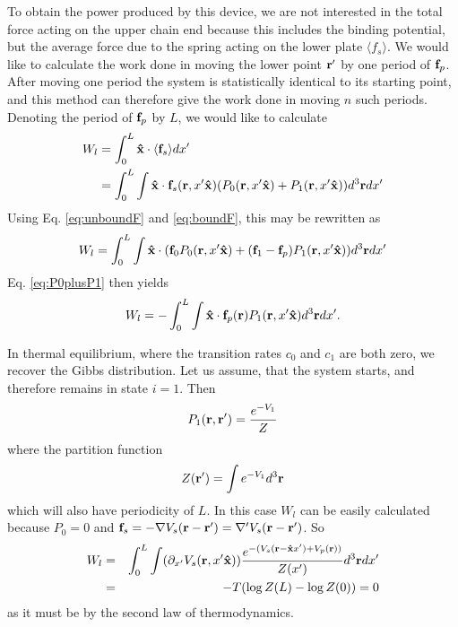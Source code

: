\documentclass[11pt]{ucthesis}
\def\br{{\bf r}}
\def\bof{{\bf f}}
\def\xhat{{\bf\hat x}}
\begin{document}
To obtain the power produced by this device, we are not interested in the total
force acting on the upper chain end because this includes the binding potential, but the
average force due to the spring acting on the lower plate $\langle f_s\rangle$. We would like
to calculate the work done in moving the lower point $\br'$ by one period of
$\bof_p$. After moving one period the system is statistically identical to its
starting point, and this method can therefore give the work done in moving $n$
such periods. Denoting the period of $\bof_p$ by $L$, we would like to calculate
\begin{align}
\label{eq:defnWL}
W_l &= \int_0^L \xhat\cdot \langle \bof_s\rangle dx' \nonumber\\
      &= \int_0^L \int \xhat\cdot \bof_s(\br,x'\xhat)(P_0(\br,x'\xhat)+P_1(\br,x'\xhat))d^3\br dx'
\end{align}
Using Eq. \ref{eq:unboundF} and \ref{eq:boundF}, this may be rewritten as
\begin{equation}
W_l = \int_0^L \int \xhat\cdot(\bof_0P_0(\br,x'\xhat)+(\bof_1 - \bof_p)P_1(\br,x'\xhat))d^3\br dx'
\end{equation} 
Eq. \ref{eq:P0plusP1} then yields
\begin{equation}
\label{eq:WL}
W_l = -\int_0^L \int \xhat\cdot \bof_p(\br)P_1(\br,x'\xhat)d^3\br dx' .
\end{equation}

In thermal equilibrium, where the transition rates $c_0$ and $c_1$ are both zero, 
we recover the Gibbs distribution. Let us assume, that the system starts, and
therefore remains in state $i=1$. Then
\begin{equation}
P_1(\br, \br') = \frac{e^{-V_1}}{Z}
\end{equation}
where the partition function 
\begin{equation}
Z(\br') = \int e^{-V_1} d^3\br 
\end{equation}
which will also have periodicity of $L$.
In this case $W_l$ can be easily calculated because $P_0 =0$ and $\bof_s = -\nabla
V_s(\br-\br') = \nabla'V_s(\br-\br')$. So 
\begin{eqnarray}
\label{eq:Weq0}
W_l &=& \int_0^L \int (\partial_{x'}V_s(\br,x'\xhat)) \frac{e^{-(V_s(\br-\xhat x')+V_p(\br))}}{Z(x')} d^3\br dx'\nonumber\\
    &=& -T (\log Z(L) - \log Z(0)) = 0
\end{eqnarray}
as it must be by the second law of thermodynamics.
\end{document}
